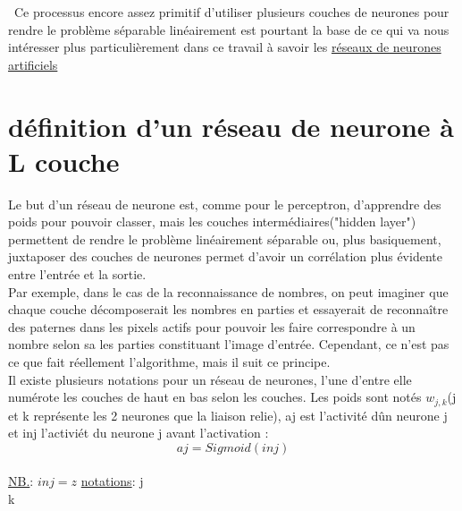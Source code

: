 \documentclass[openany,14pt,fleqn]{book} %
\begin{document}
\ Ce processus encore assez primitif  d'utiliser plusieurs couches de neurones pour rendre le problème séparable linéairement est pourtant la base de ce qui va nous intéresser plus particulièrement dans ce travail à savoir les \underline{réseaux de neurones artificiels}
\section {définition d'un réseau de neurone à L couche}
Le but d'un réseau de neurone est, comme pour le perceptron, d'apprendre des poids pour pouvoir classer, mais les couches intermédiaires("hidden layer") permettent de rendre le problème linéairement séparable ou, plus basiquement, juxtaposer des couches de neurones permet d'avoir un corrélation plus évidente entre l'entrée et la sortie.\\
Par exemple, dans le cas de la reconnaissance de nombres, on peut imaginer que chaque couche décomposerait les nombres en parties et essayerait de reconnaître des paternes dans les pixels actifs pour pouvoir les faire correspondre à un nombre selon sa les parties constituant l'image d'entrée. Cependant, ce n'est pas ce que fait réellement l'algorithme, mais il suit ce principe.\\
Il existe plusieurs notations pour un réseau de neurones, l'une d'entre elle numérote les couches de haut en bas selon les couches. Les poids sont notés $w_{j,k}$(j et k représente les 2 neurones que la liaison relie), aj est l'activité dûn neurone j et inj l'activiét du neurone j avant l'activation :
\[ aj=Sigmoid(inj)\]\\
\underline{NB.}: $inj = z$
\underline{notations}:
j\\
k\\
\end{document}
